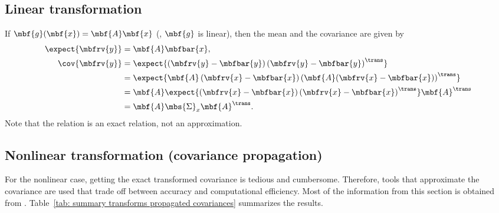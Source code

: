 \subsection{Linear transformation}
If $\mbf{g}(\mbf{x})=\mbf{A}\mbf{x}$ (\ie, $\mbf{g}$ is linear), then the mean and the covariance are given by
\begin{align}
    \expect{\mbfrv{y}} &= \mbf{A}\mbfbar{x},\\
    \cov{\mbfrv{y}} &= \expect{\left(\mbfrv{y}-\mbfbar{y}\right)\left(\mbfrv{y}-\mbfbar{y}\right)^{\trans}}\\
    &= \expect{\mbf{A}\left(\mbfrv{x}-\mbfbar{x}\right)\left(\mbf{A}(\mbfrv{x}-\mbfbar{x})\right)^{\trans}}\\
    &= \mbf{A}\expect{\left(\mbfrv{x}-\mbfbar{x}\right)\left(\mbfrv{x}-\mbfbar{x}\right)^{\trans}}\mbf{A}^{\trans}\\
    &= \mbf{A}\mbs{\Sigma}_{x}\mbf{A}^{\trans}.
\end{align}
Note that the relation is an exact relation, not an approximation.

\subsection{Nonlinear transformation (covariance propagation)}
For the nonlinear case, getting the exact transformed covariance is tedious and cumbersome. Therefore, tools that approximate the covariance are used that trade off between accuracy and computational efficiency. Most of the information from this section is obtained from \cite{gustafsson_nonlinear_2008}. Table~\ref{tab: summary transforms propagated covariances} summarizes the results.

